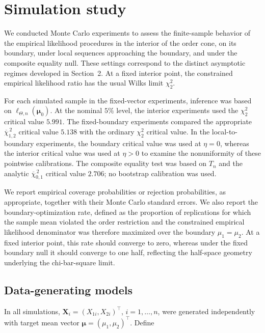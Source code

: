 \documentclass[11pt]{article}
\theoremstyle{remark}
\newcommand{\barchi}[2]{\overline{\chi}^{\,2}_{#1,#2}}
\begin{document}
\section{Simulation study}\label{sec:simulation}

We conducted Monte Carlo experiments to assess the finite-sample behavior of the empirical likelihood procedures in the interior of the order cone, on its boundary, under local sequences approaching the boundary, and under the composite equality null. These settings correspond to the distinct asymptotic regimes developed in Section~2. At a fixed interior point, the constrained empirical likelihood ratio has the usual Wilks limit $\chi^2_2$.

For each simulated sample in the fixed-vector experiments, inference was based on $\ell_{\Theta,n}(\boldsymbol{\mu}_0)$. At the nominal $5\%$ level, the interior experiments used the $\chi^2_2$ critical value $5.991$. The fixed-boundary experiments compared the appropriate $\barchi{1}{2}$ critical value $5.138$ with the ordinary $\chi^2_2$ critical value. In the local-to-boundary experiments, the boundary critical value was used at $\eta=0$, whereas the interior critical value was used at $\eta>0$ to examine the nonuniformity of these pointwise calibrations. The composite equality test was based on $T_n$ and the analytic $\barchi{0}{1}$ critical value $2.706$; no bootstrap calibration was used.

We report empirical coverage probabilities or rejection probabilities, as appropriate, together with their Monte Carlo standard errors. We also report the boundary-optimization rate, defined as the proportion of replications for which the sample mean violated the order restriction and the constrained empirical likelihood denominator was therefore maximized over the boundary $\mu_1=\mu_2$. At a fixed interior point, this rate should converge to zero, whereas under the fixed boundary null it should converge to one half, reflecting the half-space geometry underlying the chi-bar-square limit.

\subsection*{Data-generating models}\label{subsec:data-generating-models}

In all simulations, $\boldsymbol{X}_i=(X_{1i},X_{2i})^\top$, $i=1,\ldots,n$, were generated independently with target mean vector $\boldsymbol{\mu}=(\mu_1,\mu_2)^\top$. Define
\end{document}
